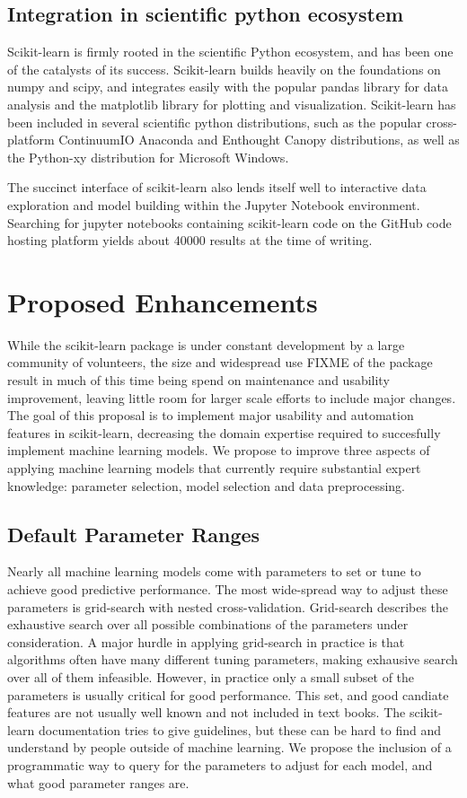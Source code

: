 \subsection{Integration in scientific python ecosystem}
Scikit-learn is firmly rooted in the scientific Python ecosystem, and has been
one of the catalysts of its success. Scikit-learn builds heavily on the
foundations on numpy and scipy, and integrates easily with the popular pandas
library for data analysis and the matplotlib library for plotting and
visualization.
Scikit-learn has been included in several scientific python distributions, such
as the popular cross-platform ContinuumIO Anaconda and Enthought Canopy
distributions, as well as the Python-xy distribution for Microsoft Windows.

The succinct interface of scikit-learn also lends itself well to interactive
data exploration and model building within the Jupyter Notebook environment.
Searching for jupyter notebooks containing scikit-learn code on the GitHub code
hosting platform yields about 40000 results at the time of writing.

\section{Proposed Enhancements}
While the scikit-learn package is under constant development by a large community
of volunteers, the size and widespread use FIXME of the package result in much of this
time being spend on maintenance and usability improvement, leaving little room
for larger scale efforts to include major changes. The goal of this proposal
is to implement major usability and automation features in scikit-learn, decreasing
the domain expertise required to succesfully implement machine learning models.
We propose to improve three aspects of applying machine learning models that
currently require substantial expert knowledge: parameter selection, model
selection and data preprocessing.

\subsection{Default Parameter Ranges}
Nearly all machine learning models come with parameters to set or tune
to achieve good predictive performance. The most wide-spread way to adjust
these parameters is grid-search with nested cross-validation.
Grid-search describes the exhaustive search over all possible combinations
of the parameters under consideration.
A major hurdle in applying grid-search in practice is that algorithms
often have many different tuning parameters, making exhausive search
over all of them infeasible. However, in practice only a small subset
of the parameters is usually critical for good performance. This set,
and good candiate features are not usually well known and not included in text books.
The scikit-learn documentation tries to give guidelines, but these can be hard
to find and understand by people outside of machine learning.
We propose the inclusion of a programmatic way to query for the parameters
to adjust for each model, and what good parameter ranges are.

